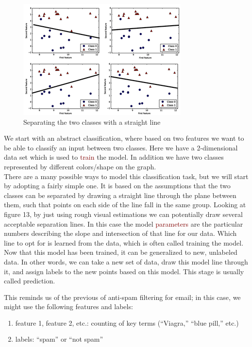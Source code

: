 \documentclass{tufte-handout}
\newcommand{\hlred}[1]{\textcolor{Maroon}{#1}}%
\begin{document}
\begin{figure}[h]%
  \includegraphics[width=\linewidth]{Classification_1.png}
  \caption{Separating the two classes with a straight line}
  \label{fig:Class}
\end{figure}


We start with an abstract classification, where based on two features we want to be able to classify an input between two classes. Here we have a 2-dimensional data set which is used to \hlred{train} the model. In addition we have two classes represented by different colors/shape on the graph. 
\\There are a many possible ways to model this classification task, but we will start by adopting a fairly simple one. It is based on the assumptions that the two classes can be separated by drawing a straight line through the plane between them, such that points on each side of the line fall in the same group. Looking at figure 13, by just using rough visual estimations we can potentially draw several acceptable separation lines. In this case the model \hlred{parameters} are the particular numbers describing the slope and intersection of that line for our data. Which line to opt for is learned from the data, which is often called training the model.
Now that this model has been trained, it can be generalized to new, unlabeled data. In other words, we can take a new set of data, draw this model line through it, and assign labels to the new points based on this model. This stage is usually called prediction.

This reminds us of the previous of anti-spam filtering for email; in this case, we might use the following features and labels:
\begin{enumerate}
    \item feature 1, feature 2, etc.: counting of key terms (“Viagra,” “blue pill,” etc.)
    \item labels:   “spam” or “not spam”
\end{enumerate}
\end{document}
